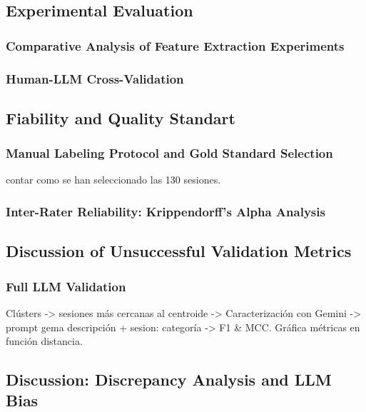     \subsection{Experimental Evaluation}
        \subsubsection{Comparative Analysis of Feature Extraction Experiments}
        \subsubsection{Human-LLM Cross-Validation}


    \subsection{Fiability and Quality Standart}
        \subsubsection{Manual Labeling Protocol and Gold Standard Selection}

        contar como se han seleccionado las 130 sesiones. 
        
        \subsubsection{Inter-Rater Reliability: Krippendorff's Alpha Analysis}




    \subsection{Discussion of Unsuccessful Validation Metrics}

    \subsubsection{Full LLM Validation}
        Clústers -> sesiones más cercanas al centroide -> Caracterización con Gemini -> prompt gema descripción + sesion: categoría -> F1 \& MCC.
        Gráfica métricas en función distancia. 

    
    \subsection{Discussion: Discrepancy Analysis and LLM Bias}